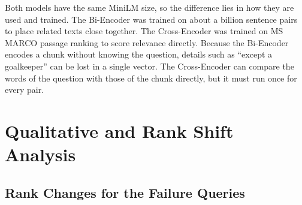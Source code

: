 \documentclass[11pt,a4paper]{article}
\begin{document}
Both models have the same MiniLM size, so the difference lies in how they are used and trained. The Bi-Encoder was
trained on about a billion sentence pairs to place related texts close together. The Cross-Encoder was trained on
MS MARCO passage ranking to score relevance directly. Because the Bi-Encoder encodes a chunk without knowing the
question, details such as ``except a goalkeeper'' can be lost in a single vector. The Cross-Encoder can compare the
words of the question with those of the chunk directly, but it must run once for every pair.

\section{Qualitative and Rank Shift Analysis}

\subsection{Rank Changes for the Failure Queries}
\end{document}
